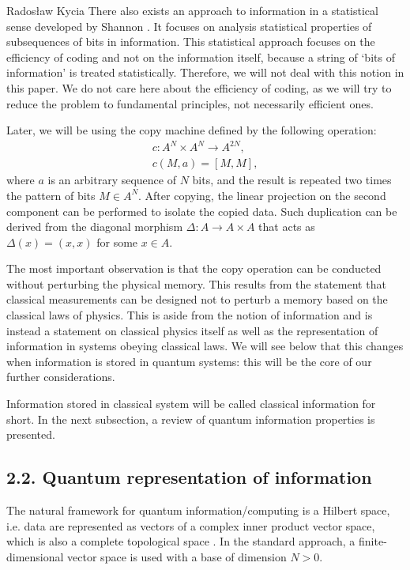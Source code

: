 \begin{artengenv}{Radosław Kycia}
There also exists an approach to information in a statistical sense developed by Shannon \parencite{RezaInformation}. It focuses on analysis statistical properties of subsequences of bits in information. This statistical approach focuses on the efficiency of coding and not on the information itself, because a string of `bits of information' is treated statistically. Therefore, we will not deal with this notion in this paper. We do not care here about the efficiency of coding, as we will try to reduce the problem to fundamental principles, not necessarily efficient ones.


Later, we will be using the copy machine defined by the following operation:
\begin{equation}
\begin{array}{c}
 c: A^N \times A^N \rightarrow A^{2N}, \\
 c(M,a)= [M,M],
\end{array}
\end{equation}
where $a$ is an arbitrary sequence of $N$ bits, and the result is repeated two times the pattern of bits $M \in A^N$. After copying, the linear projection on the second component can be performed to isolate the copied data. Such duplication can be derived from the diagonal morphism  \parencite[see][]{RosettaStone_Baez} $\Delta :A \rightarrow A \times A$ that acts as $\Delta (x) = (x,x)$ for some $x \in A$.

The most important observation is that the copy operation can be conducted without perturbing the physical memory. This results from the statement that classical measurements can be designed not to perturb a memory based on the classical laws of physics. This is aside from the notion of information and is instead a statement on classical physics itself as well as the representation of information in systems obeying classical laws. We will see below that this changes when information is stored in quantum systems: this will be the core of our further considerations.


Information stored in classical system will be called classical information for short. In the next subsection, a review of quantum information properties is presented.

\subsection{2.2. Quantum representation of information}

The natural framework for quantum information/computing is a Hilbert space, i.e. data are represented as vectors of a complex inner product vector space, which is also a complete topological space \parencite{FunctionalAnalysisReed}. In the standard approach, a finite-dimensional vector space is used with a base of dimension $N >0$.


\end{artengenv}
